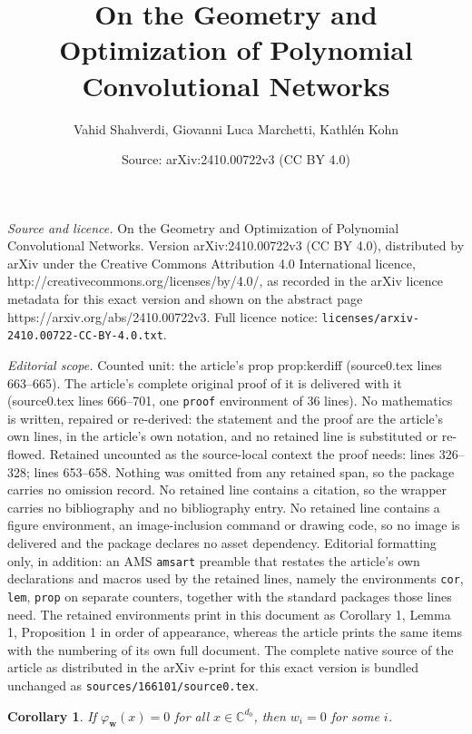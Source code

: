 \documentclass[10pt,a4paper]{amsart}
\title{On the Geometry and Optimization of Polynomial Convolutional Networks}
\author{Vahid Shahverdi, Giovanni Luca Marchetti, Kathl\'en Kohn}
\date{Source: arXiv:2410.00722v3 (CC BY 4.0)}
\newtheorem{cor}{Corollary}
\begin{document}
\maketitle

\noindent\emph{Source and licence.} On the Geometry and Optimization of Polynomial Convolutional Networks. Version arXiv:2410.00722v3 (CC BY 4.0), distributed by arXiv under the Creative Commons Attribution 4.0 International licence, http://creativecommons.org/licenses/by/4.0/, as recorded in the arXiv licence metadata for this exact version and shown on the abstract page https://arxiv.org/abs/2410.00722v3. Full licence notice: \texttt{licenses/arxiv-2410.00722-CC-BY-4.0.txt}.\par\smallskip

\noindent\textit{Editorial scope.} Counted unit: the article's prop prop:kerdiff (source0.tex lines 663--665). The article's complete original proof of it is delivered with it (source0.tex lines 666--701, one \texttt{proof} environment of 36 lines). No mathematics is written, repaired or re-derived: the statement and the proof are the article's own lines, in the article's own notation, and no retained line is substituted or re-flowed.  Retained uncounted as the source-local context the proof needs: lines 326--328; lines 653--658.  Nothing was omitted from any retained span, so the package carries no omission record.  No retained line contains a citation, so the wrapper carries no bibliography and no bibliography entry.  No retained line contains a figure environment, an image-inclusion command or drawing code, so no image is delivered and the package declares no asset dependency.  Editorial formatting only, in addition: an AMS \texttt{amsart} preamble that restates the article's own declarations and macros used by the retained lines, namely the environments \texttt{cor}, \texttt{lem}, \texttt{prop} on separate counters, together with the standard packages those lines need.  The retained environments print in this document as Corollary 1, Lemma 1, Proposition 1 in order of appearance, whereas the article prints the same items with the numbering of its own full document.  The complete native source of the article as distributed in the arXiv e-print for this exact version is bundled unchanged as \texttt{sources/166101/source0.tex}.
\begin{cor}\label{cor:basepts}
    If $\varphi_\mathbf{w}(x) = 0$ for all $x \in \mathbb{C}^{d_0}$, then $w_i = 0$ for some $i$. 
\end{cor}
\end{document}
